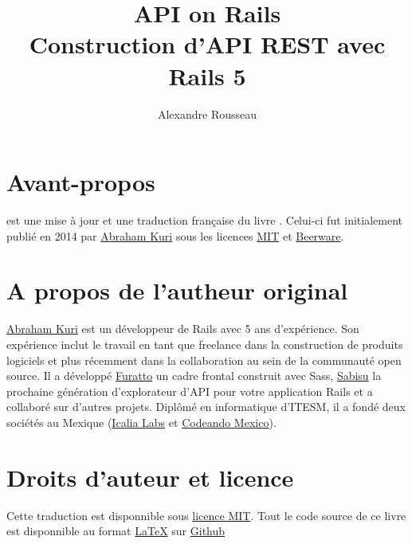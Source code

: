\documentclass[]{report}
\title{\textbf{API on Rails}\\ Construction d'API REST avec Rails 5}
\author{Alexandre Rousseau}
\begin{document}
\maketitle
\newpage
\tableofcontents
\newpage
{}

\section{Avant-propos}

   est une mise à jour et une traduction française du livre \href{http://apionrails.icalialabs.com/book/}{}. Celui-ci fut initialement publié en 2014 par \href{https://twitter.com/kurenn}{Abraham Kuri} sous les licences \href{http://opensource.org/licenses/MIT}{MIT} et \href{http://people.freebsd.org/~phk/}{Beerware}.

  \section{A propos de l'autheur original}

    \href{https://twitter.com/kurenn}{Abraham Kuri} est un développeur de Rails avec 5 ans d'expérience. Son expérience inclut le travail en tant que freelance dans la construction de produits logiciels et plus récemment dans la collaboration au sein de la communauté open source. Il a développé \href{http://icalialabs.github.io/furatto/}{Furatto} un cadre frontal construit avec Sass, \href{https://github.com/IcaliaLabs/sabisu-rails}{Sabisu} la prochaine génération d'explorateur d'API pour votre application Rails et a collaboré sur d'autres projets. Diplômé en informatique d'ITESM, il a fondé deux sociétés au Mexique (\href{http://icalialabs.com/}{Icalia Labs} et \href{http://codeandomexico.org/}{Codeando Mexico}).

  \section{Droits d'auteur et licence}

    Cette traduction est disponnible sous \href{http://opensource.org/licenses/MIT}{licence MIT}. Tout le code source de ce livre est disponnible au format \href{https://fr.wikipedia.org/wiki/LaTeX}{\LaTeX} sur \href{https://github.com/madeindjs/api_on_rails}{Github}
\end{document}
